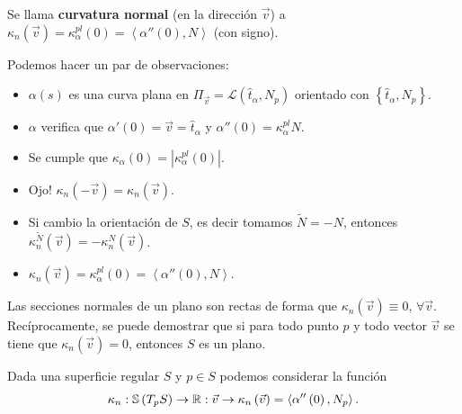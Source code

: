 \begin{definition}
Se llama \textbf{curvatura normal} (en la dirección $\displaystyle \vec{v} $) a $\displaystyle \kappa_{n}\left(\vec{v}\right)=\kappa_{\alpha }^{pl}\left(0\right) = \left\langle \alpha''\left(0\right), N \right\rangle  $ (con signo).
\end{definition}
\begin{observation}
Podemos hacer un par de observaciones:
\begin{itemize}
\item $\displaystyle \alpha\left(s\right) $ es una curva plana en $\displaystyle \Pi_{\vec{v}} = \mathcal{L}\left(\hat{t}_{\alpha }, N_{p}\right) $ orientado con $\displaystyle \left\{ \hat{t}_{\alpha }, N_{p}\right\}  $. 
\item $\displaystyle \alpha  $ verifica que $\displaystyle \alpha'\left(0\right)=\vec{v}=\hat{t}_{\alpha } $ y $\displaystyle \alpha''\left(0\right)=\kappa_{\alpha }^{pl}N $. 
\item Se cumple que $\displaystyle \kappa_{\alpha }\left(0\right)= \left|\kappa_{\alpha }^{pl}\left(0\right)\right| $.
\item Ojo! $\displaystyle \kappa_{n}\left(-\vec{v}\right)=\kappa_{n}\left(\vec{v}\right) $.
\item Si cambio la orientación de $\displaystyle S $, es decir tomamos $\displaystyle \tilde{N} = - N $, entonces $\displaystyle \kappa_{n}^{\tilde{N}}\left(\vec{v}\right)=-\kappa_{n}^{N}\left(\vec{v}\right) $.
\item $\displaystyle \kappa_{n}\left(\vec{v}\right)=\kappa_{\alpha }^{pl}\left(0\right)=\left\langle \alpha''\left(0\right), N \right\rangle  $. 
\end{itemize}
\end{observation}
\begin{eg}[Plano]
Las secciones normales de un plano son rectas de forma que $\displaystyle \kappa_{n}\left(\vec{v}\right)\equiv 0 $, $\displaystyle \forall \vec{v} $. Recíprocamente, se puede demostrar que si para todo punto $\displaystyle p  $ y todo vector $\displaystyle \vec{v} $ se tiene que $\displaystyle \kappa_{n}\left(\vec{v}\right)=0 $, entonces $\displaystyle S $ es un plano.
\end{eg}
\begin{observation}
Dada una superficie regular $\displaystyle S $ y $\displaystyle p \in S $ podemos considerar la función 
\[\kappa_{n}: \mathbb{S}\left(T_{p}S\right)\to \mathbb{R} : \vec{v} \to \kappa_{n}\left(\vec{v}\right)=\left\langle \alpha''\left(0\right), N_{p} \right\rangle  .\]
\end{observation}
